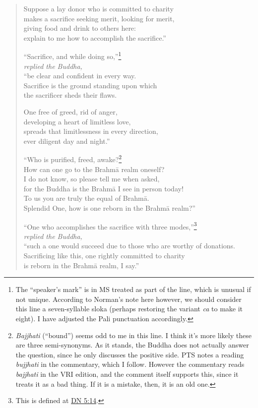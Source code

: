 \documentclass[12pt,openany]{book}%
\newcommand*{\scspeaker}[1]{\hspace{2em}\textit{#1}}
\begin{document}
\begin{verse}
Suppose a lay donor who is committed to charity \\
makes a sacrifice seeking merit, looking for merit, \\
giving food and drink to others here: \\
explain to me how to accomplish the sacrifice.” 

“Sacrifice, and while doing so,”\footnote{The “speaker’s mark” is in MS treated as part of the line, which is unusual if not unique. According to Norman’s note here however, we should consider this line a seven-syllable sloka (perhaps restoring the variant \textit{ca} to make it eight). I have adjusted the Pali punctuation accordingly. } \\
\scspeaker{replied the Buddha, }\\
“be clear and confident in every way. \\
Sacrifice is the ground standing upon which \\
the sacrificer sheds their flaws. 

One free of greed, rid of anger, \\
developing a heart of limitless love, \\
spreads that limitlessness in every direction, \\
ever diligent day and night.” 

“Who is purified, freed, awake?\footnote{\textit{Bajjhati} (“bound”) seems odd to me in this line. I think it’s more likely these are three semi-synonyms. As it stands, the Buddha does not actually answer the question, since he only discusses the positive side. PTS notes a reading \textit{bujjhati} in the commentary, which I follow. However the commentary reads \textit{bajjhati} in the VRI edition, and the comment itself supports this, since it treats it as a bad thing. If it is a mistake, then, it is an old one. } \\
How can one go to the \textsanskrit{Brahmā} realm oneself? \\
I do not know, so please tell me when asked, \\
for the Buddha is the \textsanskrit{Brahmā} I see in person today! \\
To us you are truly the equal of \textsanskrit{Brahmā}. \\
Splendid One, how is one reborn in the \textsanskrit{Brahmā} realm?” 

“One who accomplishes the sacrifice with three modes,”\footnote{This is defined at \href{https://suttacentral.net/dn5/en/sujato\#14}{DN 5:14}. } \\
\scspeaker{replied the Buddha, }\\
“such a one would succeed due to those who are worthy of donations. \\
Sacrificing like this, one rightly committed to charity \\
is reborn in the \textsanskrit{Brahmā} realm, I say.” 

%
\end{verse}
\end{document}

